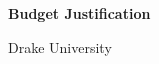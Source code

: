 \documentclass[11pt]{article}
\begin{document}
    \setcounter{page}{1}
    \begin{center}
        {\Large {\bf Budget Justification}}
    \end{center}

    \begin{center}
        {\Large Drake University}
    \end{center}




\end{document}
